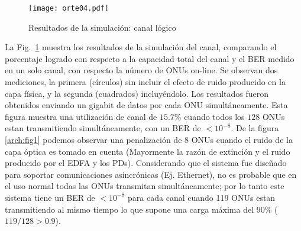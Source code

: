 \begin{figure}[!t]
    \centering
      \texttt{[image: orte04.pdf]}
    \caption{Resultados de la simulación: canal lógico}
      \label{sim:access}
\end{figure}

La Fig.~\ref{sim:access} muestra los resultados de la simulación del canal, comparando el porcentaje logrado con respecto a la capacidad total del canal y el BER medido en un solo canal, con respecto la número de ONUs on-line. Se observan dos mediciones, la primera (círculos) sin incluir el efecto de ruido producido en la capa física, y la segunda (cuadrados) incluyéndolo.
Los resultados fueron obtenidos enviando un gigabit de datos por cada ONU simultáneamente. Esta figura muestra una utilización de canal de $15.7\%$ cuando todos los $128$ ONUs estan transmitiendo simultáneamente, con un BER de $<10^{-8}$. 
De la figura \ref{arch:fig1} podemos observar una penalización de $8$ ONUs cuando el ruido de la capa óptica es tomado en cuenta (Mayormente la razón de extinción y el ruido producido por el EDFA y los PDs).
Considerando que el sistema fue diseñado para soportar comunicaciones asincrónicas (Ej. Ethernet), no es probable que en el uso normal todas las ONUs transmitan simultáneamente; por lo tanto este sistema tiene un BER de $<10^{-8}$ para cada canal cuando 119 ONUs estan transmitiendo al mismo tiempo lo que supone una carga máxima del $90\%$ ($119/128>0.9$). 


